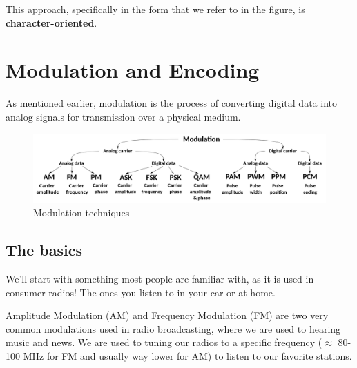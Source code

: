 This approach, specifically in the form that we refer to in the figure, is \textbf{character-oriented}.
\vfill
\section{Modulation and Encoding}
As mentioned earlier, modulation is the process of converting digital data into analog signals for transmission over a physical medium.

\begin{figure}[h]
    \centering
    \includegraphics[width=\textwidth]{assets/osi/physical/signals/modulation.png}
    \caption{Modulation techniques}\label{fig:modulation_techniques}
\end{figure}

\subsection{The basics}
We'll start with something most people are familiar with, as it is used in consumer radios! The ones you listen to in your car or at home.

Amplitude Modulation (AM) and Frequency Modulation (FM) are two very common modulations used in radio broadcasting, where we are used to hearing music and news. We are used to tuning our radios to a specific frequency ($\approx$ 80-100 MHz for FM and usually way lower for AM) to listen to our favorite stations.

